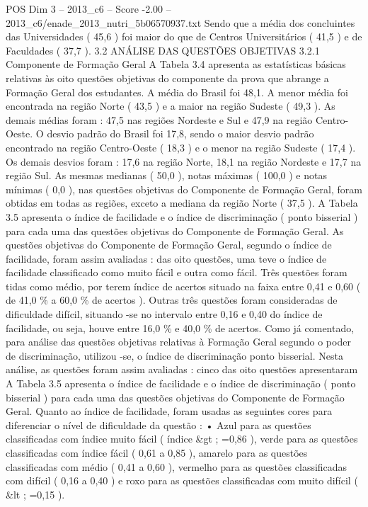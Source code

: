 \begin{textsample}{POS Dim 3 – 2013\_c6 – Score -2.00 – 2013\_c6/enade\_2013\_nutri\_5b06570937.txt}
Sendo que a média dos concluintes das Universidades ( 45,6 ) foi maior do que de Centros Universitários ( 41,5 ) e de Faculdades ( 37,7 ). 3.2 ANÁLISE DAS QUESTÕES OBJETIVAS 3.2.1 Componente de Formação Geral A Tabela 3.4 apresenta as estatísticas básicas relativas às oito questões objetivas do componente da prova que abrange a Formação Geral dos estudantes.
A média do Brasil foi 48,1.
A menor média foi encontrada na região Norte ( 43,5 ) e a maior na região Sudeste ( 49,3 ).
As demais médias foram : 47,5 nas regiões Nordeste e Sul e 47,9 na região Centro-Oeste.
O desvio padrão do Brasil foi 17,8, sendo o maior desvio padrão encontrado na região Centro-Oeste ( 18,3 ) e o menor na região Sudeste ( 17,4 ).
Os demais desvios foram : 17,6 na região Norte, 18,1 na região Nordeste e 17,7 na região Sul.
As mesmas medianas ( 50,0 ), notas máximas ( 100,0 ) e notas mínimas ( 0,0 ), nas questões objetivas do Componente de Formação Geral, foram obtidas em todas as regiões, exceto a mediana da região Norte ( 37,5 ).
A Tabela 3.5 apresenta o índice de facilidade e o índice de discriminação ( ponto bisserial ) para cada uma das questões objetivas do Componente de Formação Geral.
As questões objetivas do Componente de Formação Geral, segundo o índice de facilidade, foram assim avaliadas : das oito questões, uma teve o índice de facilidade classificado como muito fácil e outra como fácil.
Três questões foram tidas como médio, por terem índice de acertos situado na faixa entre 0,41 e 0,60 ( de 41,0 \% a 60,0 \% de acertos ).
Outras três questões foram consideradas de dificuldade difícil, situando -se no intervalo entre 0,16 e 0,40 do índice de facilidade, ou seja, houve entre 16,0 \% e 40,0 \% de acertos.
Como já comentado, para análise das questões objetivas relativas à Formação Geral segundo o poder de discriminação, utilizou -se, o índice de discriminação ponto bisserial.
Nesta análise, as questões foram assim avaliadas : cinco das oito questões apresentaram A Tabela 3.5 apresenta o índice de facilidade e o índice de discriminação ( ponto bisserial ) para cada uma das questões objetivas do Componente de Formação Geral.
Quanto ao índice de facilidade, foram usadas as seguintes cores para diferenciar o nível de dificuldade da questão : • Azul para as questões classificadas com índice muito fácil ( índice \&gt ; =0,86 ), verde para as questões classificadas com índice fácil ( 0,61 a 0,85 ), amarelo para as questões classificadas com médio ( 0,41 a 0,60 ), vermelho para as questões classificadas com difícil ( 0,16 a 0,40 ) e roxo para as questões classificadas com muito difícil ( \&lt ; =0,15 ).

\end{textsample}
